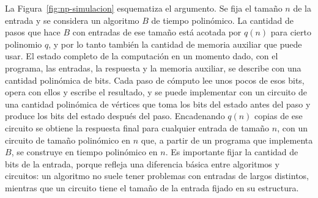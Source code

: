 \documentclass[12pt, spanish, oneside, openany]{book}
\theoremstyle{uprightplain}
\theoremstyle{definition}
\theoremstyle{remark}
\theoremstyle{definition}
\begin{document}
La Figura~\ref{fig:np-simulacion} esquematiza el argumento. Se fija el tamaño $n$ de la entrada y se considera un algoritmo $B$ de tiempo polinómico. La cantidad de pasos que hace $B$ con entradas de ese tamaño está acotada por $q(n)$ para cierto polinomio $q$, y por lo tanto también la cantidad de memoria auxiliar que puede usar. El estado completo de la computación en un momento dado, con el programa, las entradas, la respuesta y la memoria auxiliar, se describe con una cantidad polinómica de bits. Cada paso de cómputo lee unos pocos de esos bits, opera con ellos y escribe el resultado, y se puede implementar con un circuito de una cantidad polinómica de vértices que toma los bits del estado antes del paso y produce los bits del estado después del paso. Encadenando $q(n)$ copias de ese circuito se obtiene la respuesta final para cualquier entrada de tamaño $n$, con un circuito de tamaño polinómico en $n$ que, a partir de un programa que implementa $B$, se construye en tiempo polinómico en $n$. Es importante fijar la cantidad de bits de la entrada, porque refleja una diferencia básica entre algoritmos y circuitos: un algoritmo no suele tener problemas con entradas de largos distintos, mientras que un circuito tiene el tamaño de la entrada fijado en su estructura.
\end{document}

